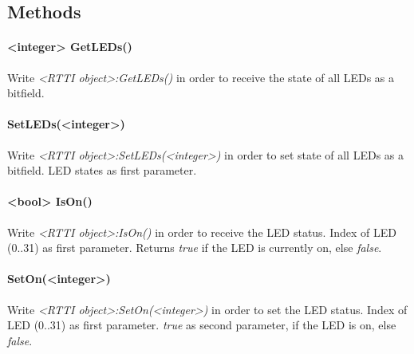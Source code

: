 \subsection{Methods}

\paragraph{<integer> GetLEDs()}
Write \emph{<RTTI object>:GetLEDs()} in order to receive the state of all LEDs as a bitfield.

\paragraph{SetLEDs(<integer>)}
Write \emph{<RTTI object>:SetLEDs(<integer>)} in order to set state of all LEDs as a bitfield. LED states as first parameter.

\paragraph{<bool> IsOn()}
Write \emph{<RTTI object>:IsOn()} in order to receive the LED status. Index of LED (0..31) as first parameter. Returns \emph{true} if the LED is currently on, else \emph{false}.

\paragraph{SetOn(<integer>)}
Write \emph{<RTTI object>:SetOn(<integer>)} in order to set the LED status. Index of LED (0..31) as first parameter. \emph{true} as second parameter, if the LED is on, else \emph{false}.
